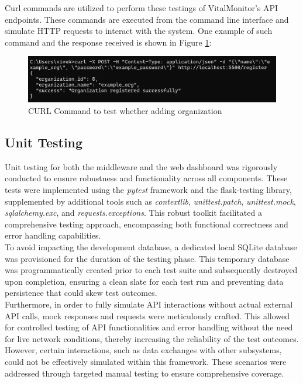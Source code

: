 Curl commands are utilized to perform these testings of VitalMonitor's API endpoints. These commands are executed from the command line interface and simulate HTTP requests to interact with the system. One example of such command and the response received is shown in Figure \ref{fig:curl-command}:

\begin{figure}[h!]
    \centering
    \includegraphics[width=1\linewidth]{images/curl-command.png}
    \caption{CURL Command to test whether adding organization }
    \label{fig:curl-command}
\end{figure}


\subsection{Unit Testing}
Unit testing for both the middleware and the web dashboard was rigorously conducted to ensure robustness and functionality across all components. These tests were implemented using the \textit{pytest} framework and the flask-testing library, supplemented by additional tools such as \textit{contextlib}, \textit{unittest.patch}, \textit{unittest.mock}, \textit{sqlalchemy.exc}, and \textit{requests.exceptions}. This robust toolkit facilitated a comprehensive testing approach, encompassing both functional correctness and error handling capabilities. \\

\noindent To avoid impacting the development database, a dedicated local SQLite database was provisioned for the duration of the testing phase. This temporary database was programmatically created prior to each test suite and subsequently destroyed upon completion, ensuring a clean slate for each test run and preventing data persistence that could skew test outcomes.\\

\noindent Furthermore, in order to fully simulate API interactions without actual external API calls, mock responses and requests were meticulously crafted. This allowed for controlled testing of API functionalities and error handling without the need for live network conditions, thereby increasing the reliability of the test outcomes. However, certain interactions, such as data exchanges with other subsystems, could not be effectively simulated within this framework. These scenarios were addressed through targeted manual testing to ensure comprehensive coverage.\\

